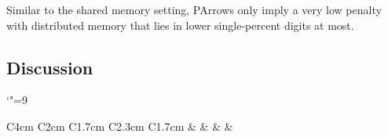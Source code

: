 \documentclass{jfp1}
\begin{document}
Similar to the shared memory setting, PArrows only imply a very low penalty with distributed memory that lies in lower single-percent digits at most.

\subsection{Discussion}


\begin{table}[]
\centering
\caption{Overhead in the shared memory benchmarks. Bold marks values in favour of PArrows.}
\label{tab:meanOverheadSharedMemory}
\centering
\begingroup\catcode`"=9
\begin{tabular}{C{4cm} C{2cm} C{1.7cm} C{2.3cm} C{1.7cm}}
	 &              &  &  &  \\ \hline \\
	\\ \hline \\
	\\ \hline \\
	\\ \hline \\
\end{tabular}
\endgroup
\end{table}
\end{document}
